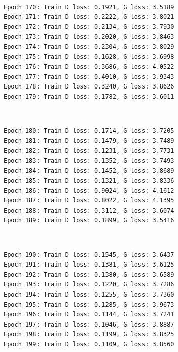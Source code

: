 \documentclass[11pt]{article}
\begin{document}
    \begin{center}
    \end{center}
    { \hspace*{\fill} \\}
    
    \begin{Verbatim}[commandchars=\\\{\}]
Epoch 170: Train D loss: 0.1921, G loss: 3.5189
Epoch 171: Train D loss: 0.2222, G loss: 3.8021
Epoch 172: Train D loss: 0.2134, G loss: 3.7930
Epoch 173: Train D loss: 0.2020, G loss: 3.8463
Epoch 174: Train D loss: 0.2304, G loss: 3.8029
Epoch 175: Train D loss: 0.1628, G loss: 3.6998
Epoch 176: Train D loss: 0.3686, G loss: 4.0522
Epoch 177: Train D loss: 0.4010, G loss: 3.9343
Epoch 178: Train D loss: 0.3240, G loss: 3.8626
Epoch 179: Train D loss: 0.1782, G loss: 3.6011

    \end{Verbatim}

    \begin{center}
    \end{center}
    { \hspace*{\fill} \\}
    
    \begin{Verbatim}[commandchars=\\\{\}]
Epoch 180: Train D loss: 0.1714, G loss: 3.7205
Epoch 181: Train D loss: 0.1479, G loss: 3.7489
Epoch 182: Train D loss: 0.1231, G loss: 3.7731
Epoch 183: Train D loss: 0.1352, G loss: 3.7493
Epoch 184: Train D loss: 0.1452, G loss: 3.8689
Epoch 185: Train D loss: 0.1321, G loss: 3.8336
Epoch 186: Train D loss: 0.9024, G loss: 4.1612
Epoch 187: Train D loss: 0.8022, G loss: 4.1395
Epoch 188: Train D loss: 0.3112, G loss: 3.6074
Epoch 189: Train D loss: 0.1899, G loss: 3.5416

    \end{Verbatim}

    \begin{center}
    \end{center}
    { \hspace*{\fill} \\}
    
    \begin{Verbatim}[commandchars=\\\{\}]
Epoch 190: Train D loss: 0.1545, G loss: 3.6437
Epoch 191: Train D loss: 0.1381, G loss: 3.6125
Epoch 192: Train D loss: 0.1380, G loss: 3.6589
Epoch 193: Train D loss: 0.1220, G loss: 3.7286
Epoch 194: Train D loss: 0.1255, G loss: 3.7360
Epoch 195: Train D loss: 0.1285, G loss: 3.9673
Epoch 196: Train D loss: 0.1144, G loss: 3.7241
Epoch 197: Train D loss: 0.1046, G loss: 3.8887
Epoch 198: Train D loss: 0.1199, G loss: 3.8325
Epoch 199: Train D loss: 0.1109, G loss: 3.8560

    \end{Verbatim}
\end{document}
